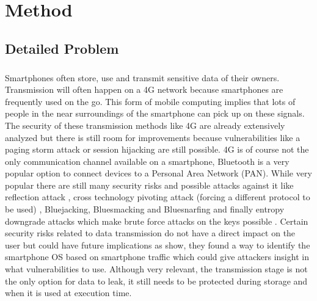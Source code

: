 \documentclass{report}
\begin{document}
\chapter{Method}

\section{Detailed Problem}

\paragraph*{}
Smartphones often store, use and transmit sensitive data of their owners. Transmission will often happen on a 4G network because smartphones are frequently used on the go. This form of mobile computing implies that lots of people in the near surroundings of the smartphone can pick up on these signals. The security of these transmission methods like 4G are already extensively analyzed \cite{FerragMohamedAmine2018Sf4a} \cite{ZakiRanaM20214NSA} \cite{JasimKhalidFadhil2022AoEA} but there is still room for improvements because vulnerabilities like a paging storm attack \cite{FangKaiming2020Psaa} or session hijacking \cite{LuYu-Han2020Gcfo} are still possible. 4G is of course not the only communication channel available on a smartphone, Bluetooth is a very popular option to connect devices to a Personal Area Network (PAN). While very popular there are still many security risks and possible attacks against it like reflection attack \cite{ClaverieTristan2021BRoB}, cross technology pivoting attack (forcing a different protocol to be used) \cite{CayreRomain2021CaWa}, Bluejacking, Bluesmacking and Bluesnarfing \cite{PatelNishitkumar2021IBVt} and finally entropy downgrade attacks which make brute force attacks on the keys possible \cite{AntonioliDaniele2020KNDA}. Certain security risks related to data transmission do not have a direct impact on the user but could have future implications as \cite{ZhuYe2021TSOS} show, they found a way to identify the smartphone OS based on smartphone traffic which could give attackers insight in what vulnerabilities to use. Although very relevant, the transmission stage is not the only option for data to leak, it still needs to be protected during storage and when it is used at execution time.
\end{document}
